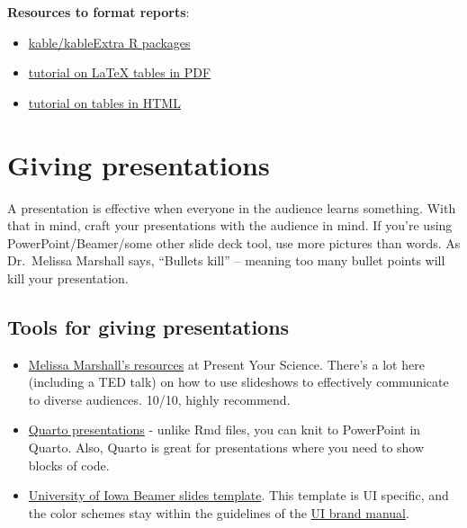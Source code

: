 \documentclass[
]{book}
\begin{document}
\textbf{Resources to format reports}:

\begin{itemize}
\item
  \href{https://bookdown.org/yihui/rmarkdown-cookbook/kableextra.html}{kable/kableExtra R packages}
\item
  \href{https://cran.r-project.org/web/packages/kableExtra/vignettes/awesome_table_in_pdf.pdf}{tutorial on LaTeX tables in PDF}
\item
  \href{https://cran.r-project.org/web/packages/kableExtra/vignettes/awesome_table_in_html.html}{tutorial on tables in HTML}
\end{itemize}

\hypertarget{giving-presentations}{%
\chapter{Giving presentations}\label{giving-presentations}}

A presentation is effective when everyone in the audience learns something. With that in mind, craft your presentations with the audience in mind. If you're using PowerPoint/Beamer/some other slide deck tool, use more pictures than words. As Dr.~Melissa Marshall says, ``Bullets kill'' -- meaning too many bullet points will kill your presentation.

\hypertarget{tools-for-giving-presentations}{%
\section{Tools for giving presentations}\label{tools-for-giving-presentations}}

\begin{itemize}
\item
  \href{https://www.presentyourscience.com/resources}{Melissa Marshall's resources} at Present Your Science. There's a lot here (including a TED talk) on how to use slideshows to effectively communicate to diverse audiences. 10/10, highly recommend.
\item
  \href{https://quarto.org/docs/presentations/}{Quarto presentations} - unlike Rmd files, you can knit to PowerPoint in Quarto. Also, Quarto is great for presentations where you need to show blocks of code.
\item
  \href{https://github.com/tabpeter/ui_latex}{University of Iowa Beamer slides template}. This template is UI specific, and the color schemes stay within the guidelines of the \href{https://brand.uiowa.edu/color}{UI brand manual}.
\end{itemize}
\end{document}
